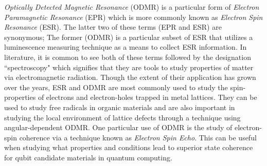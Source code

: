 \documentclass[oneside, astronomy, noacknowlegments]{BYUPhys}
\begin{document}
\textit{Optically Detected Magnetic Resonance} (ODMR) is a particular form of \textit{Electron Paramagnetic Resonance} (EPR) which is more commonly known as \textit{Electron Spin Resonance} (ESR). The latter two of these terms (EPR and ESR) are synonymous; The former (ODMR) is a particular subset of ESR that utilizes a luminescence measuring technique as a means to collect ESR information. In literature, it is common to see both of these terms followed by the designation ``spectroscopy" which signifies that they are tools to study properties of matter via electromagnetic radiation. Though the extent of their application has grown over the years, ESR and ODMR are most commonly used to study the spin-properties of electrons and electron-holes trapped in metal lattices. They can be used to study free radicals in organic materials and are also important in studying the local environment of lattice defects through a technique using angular-dependent ODMR. One particular use of ODMR is the study of electron-spin coherence via a technique known as \textit{Electron Spin Echo}. This can be useful when studying what properties and conditions lead to superior state coherence for qubit candidate materials in quantum computing.
\end{document}
